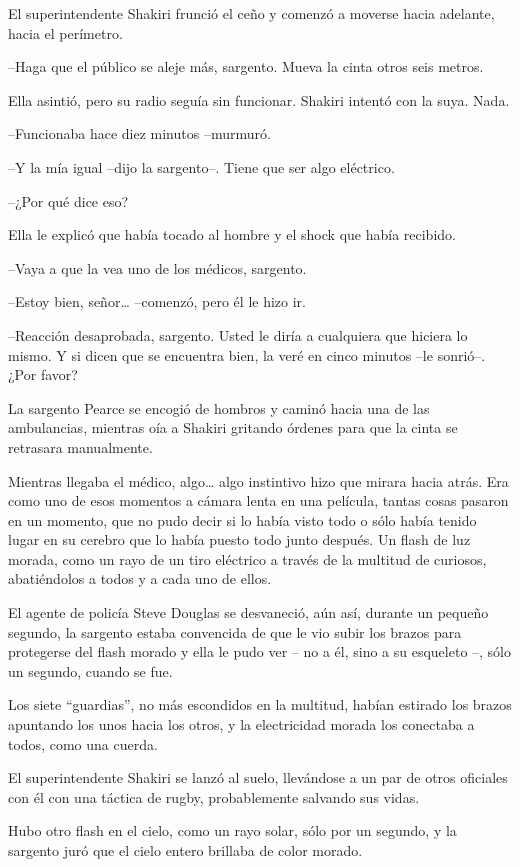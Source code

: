 El superintendente Shakiri frunció el ceño y comenzó a moverse hacia
adelante, hacia el perímetro.

--Haga que el público se aleje más, sargento. Mueva la cinta otros seis
metros.

Ella asintió, pero su radio seguía sin funcionar. Shakiri intentó con la
suya. Nada.

--Funcionaba hace diez minutos --murmuró.

--Y la mía igual --dijo la sargento--. Tiene que ser algo eléctrico.

--¿Por qué dice eso?

Ella le explicó que había tocado al hombre y el shock que había
recibido.

--Vaya a que la vea uno de los médicos, sargento.

--Estoy bien, señor\ldots{} --comenzó, pero él le hizo ir.

--Reacción desaprobada, sargento. Usted le diría a cualquiera que
hiciera lo mismo. Y si dicen que se encuentra bien, la veré en cinco
minutos --le sonrió--. ¿Por favor?

La sargento Pearce se encogió de hombros y caminó hacia una de las
ambulancias, mientras oía a Shakiri gritando órdenes para que la cinta
se retrasara manualmente.

Mientras llegaba el médico, algo\ldots{} algo instintivo hizo que mirara
hacia atrás. Era como uno de esos momentos a cámara lenta en una
película, tantas cosas pasaron en un momento, que no pudo decir si lo
había visto todo o sólo había tenido lugar en su cerebro que lo había
puesto todo junto después. Un flash de luz morada, como un rayo de un
tiro eléctrico a través de la multitud de curiosos, abatiéndolos a todos
y a cada uno de ellos.

El agente de policía Steve Douglas se desvaneció, aún así, durante un
pequeño segundo, la sargento estaba convencida de que le vio subir los
brazos para protegerse del flash morado y ella le pudo ver -- no a él,
sino a su esqueleto --, sólo un segundo, cuando se fue.

Los siete ``guardias'', no más escondidos en la multitud, habían
estirado los brazos apuntando los unos hacia los otros, y la
electricidad morada los conectaba a todos, como una cuerda.

El superintendente Shakiri se lanzó al suelo, llevándose a un par de
otros oficiales con él con una táctica de rugby, probablemente salvando
sus vidas.

Hubo otro flash en el cielo, como un rayo solar, sólo por un segundo, y
la sargento juró que el cielo entero brillaba de color morado.


